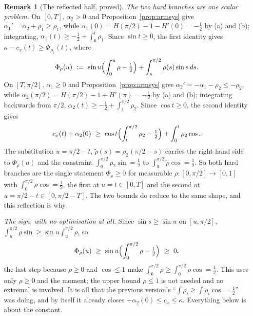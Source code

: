 \documentclass[11pt]{article}
\theoremstyle{definition}
\newtheorem{remark}[theorem]{Remark}
\begin{document}
\begin{remark}[The reflected half, proved]
\emph{The two hard branches are one scalar problem.} On $[0,T]$, $\alpha_2>0$ and
Proposition~\ref{prop:armsys} give $\alpha_1'=\alpha_2+\rho_1\ge\rho_1$, while
$\alpha_1(0)=H(\pi/2)-1-H'(0)=-\tfrac12$ by (a) and (b); integrating,
$\alpha_1(t)\ge-\tfrac12+\int_0^t\rho_1$. Since $\sin t\ge0$, the first identity gives
$\kappa-c_x(t)\ge\Phi_{\rho_1}(t)$, where
\begin{equation}\label{eq:phiform}
  \Phi_\rho(u)\ :=\ \sin u\Bigl(\int_0^u\rho-\tfrac12\Bigr)+\int_u^{\pi/2}\rho(s)\sin s\,ds .
\end{equation}
On $[T,\pi/2]$, $\alpha_1\ge0$ and Proposition~\ref{prop:armsys} give
$\alpha_2'=-\alpha_1-\rho_2\le-\rho_2$, while $\alpha_2(\pi/2)=H(\pi/2)-1+H'(\pi)=-\tfrac12$
by (a) and (b); integrating backwards from $\pi/2$,
$\alpha_2(t)\ge-\tfrac12+\int_t^{\pi/2}\rho_2$. Since $\cos t\ge0$, the second identity gives
\[
  c_x(t)+\alpha_2(0)\ \ge\ \cos t\Bigl(\int_t^{\pi/2}\rho_2-\tfrac12\Bigr)+\int_0^t\rho_2\cos .
\]
The substitution $u=\pi/2-t$, $\tilde\rho(s)=\rho_2(\pi/2-s)$ carries the right-hand side to
$\Phi_{\tilde\rho}(u)$ and the constraint $\int_0^{\pi/2}\rho_2\sin=\tfrac12$ to
$\int_0^{\pi/2}\tilde\rho\cos=\tfrac12$. So both hard branches are the single statement
$\Phi_\rho\ge0$ for measurable $\rho:[0,\pi/2]\to[0,1]$ with $\int_0^{\pi/2}\rho\cos=\tfrac12$,
the first at $u=t\in[0,T]$ and the second at $u=\pi/2-t\in[0,\pi/2-T]$. The two bounds do
reduce to the same shape, and this reflection is why.

\emph{The sign, with no optimisation at all.} Since $\sin s\ge\sin u$ on $[u,\pi/2]$,
$\int_u^{\pi/2}\rho\sin\ge\sin u\int_u^{\pi/2}\rho$, so
\[
  \Phi_\rho(u)\ \ge\ \sin u\Bigl(\int_0^{\pi/2}\rho-\tfrac12\Bigr)\ \ge\ 0 ,
\]
the last step because $\rho\ge0$ and $\cos\le1$ make
$\int_0^{\pi/2}\rho\ge\int_0^{\pi/2}\rho\cos=\tfrac12$. This uses only $\rho\ge0$ and the
moment; the upper bound $\rho\le1$ is not needed and no extremal is involved. It is all that
the previous version's ``$\int\rho_i\ge\int\rho_i\cos=\tfrac12$'' was doing, and by itself it
already closes $-\alpha_2(0)\le c_x\le\kappa$. Everything below is about the constant.


\end{remark}
\end{document}
